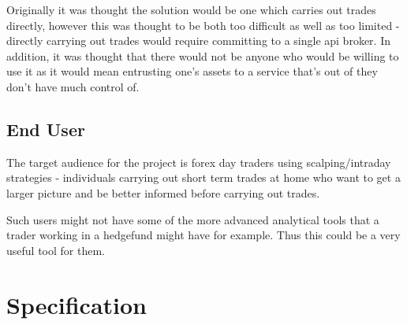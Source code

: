     Originally it was thought the solution would be one which carries out trades directly, however this was thought to be both too difficult as well as too limited - directly carrying out trades would require committing to a single api broker. In addition, it was thought that there would not be anyone who would be willing to use it as it would mean entrusting one's assets to a service that's out of they don't have much control of. 


            \subsection{End User}
            The target audience for the project is forex day traders using scalping/intraday strategies -  individuals carrying out short term trades at home who want to get a larger picture and be better informed before carrying out trades. 

            Such users might not have some of the more advanced analytical tools that a trader working in a hedgefund might have for example. Thus this could be a very useful tool for them.


    \section{Specification}
            
